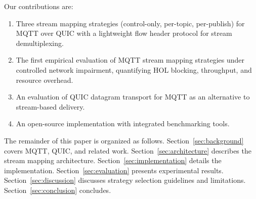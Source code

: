 Our contributions are:
\begin{enumerate}
\item Three stream mapping strategies (control-only, per-topic, per-publish) for MQTT over QUIC with a lightweight flow header protocol for stream demultiplexing.
\item The first empirical evaluation of MQTT stream mapping strategies under controlled network impairment, quantifying HOL blocking, throughput, and resource overhead.
\item An evaluation of QUIC datagram transport for MQTT as an alternative to stream-based delivery.
\item An open-source implementation with integrated benchmarking tools.
\end{enumerate}

The remainder of this paper is organized as follows. Section~\ref{sec:background} covers MQTT, QUIC, and related work. Section~\ref{sec:architecture} describes the stream mapping architecture. Section~\ref{sec:implementation} details the implementation. Section~\ref{sec:evaluation} presents experimental results. Section~\ref{sec:discussion} discusses strategy selection guidelines and limitations. Section~\ref{sec:conclusion} concludes.
